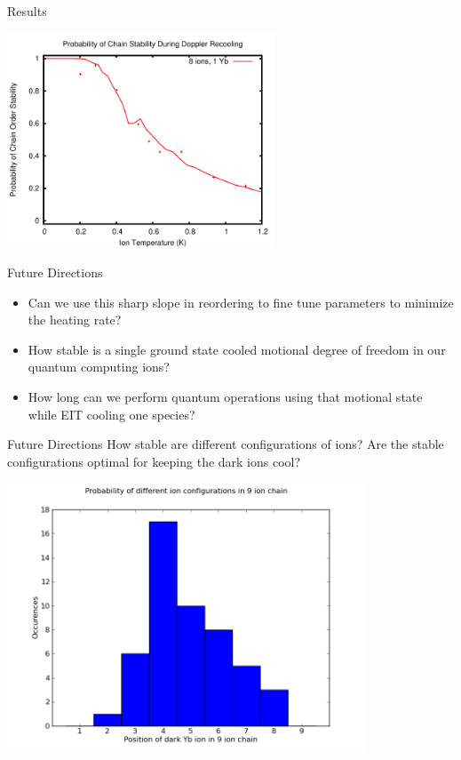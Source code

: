 \documentclass{beamer}
\begin{document}
\begin{frame}{Results}
\centerline{\includegraphics[width=0.6\textwidth]{results}}

\end{frame}

\begin{frame}{Future Directions}
\begin{itemize}
	\item Can we use this sharp slope in reordering to fine tune parameters to minimize the heating rate?
	\item How stable is a single ground state cooled motional degree of freedom in our quantum computing ions?
	\item How long can we perform quantum operations using that motional state while EIT cooling one species?
\end{itemize}
\end{frame}

\begin{frame}{Future Directions}
How stable are different configurations of ions? Are the stable configurations optimal for keeping the dark ions cool?
\centerline{\includegraphics[width=0.8\textwidth]{orderings_9_1}}
\end{frame}
\end{document}
